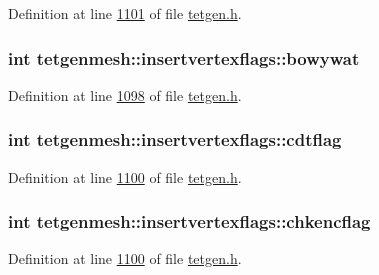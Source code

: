Definition at line \hyperlink{tetgen_8h_source_l01101}{1101} of file \hyperlink{tetgen_8h_source}{tetgen.\+h}.

\subsubsection[{\texorpdfstring{bowywat}{bowywat}}]{\setlength{\rightskip}{0pt plus 5cm}int tetgenmesh\+::insertvertexflags\+::bowywat}\hypertarget{classtetgenmesh_1_1insertvertexflags_a9b0fa5e802abd84a76e7e24c2dd448ac}{}\label{classtetgenmesh_1_1insertvertexflags_a9b0fa5e802abd84a76e7e24c2dd448ac}


Definition at line \hyperlink{tetgen_8h_source_l01098}{1098} of file \hyperlink{tetgen_8h_source}{tetgen.\+h}.

\subsubsection[{\texorpdfstring{cdtflag}{cdtflag}}]{\setlength{\rightskip}{0pt plus 5cm}int tetgenmesh\+::insertvertexflags\+::cdtflag}\hypertarget{classtetgenmesh_1_1insertvertexflags_a165eefd6dd465126f294084ef86a7a99}{}\label{classtetgenmesh_1_1insertvertexflags_a165eefd6dd465126f294084ef86a7a99}


Definition at line \hyperlink{tetgen_8h_source_l01100}{1100} of file \hyperlink{tetgen_8h_source}{tetgen.\+h}.

\subsubsection[{\texorpdfstring{chkencflag}{chkencflag}}]{\setlength{\rightskip}{0pt plus 5cm}int tetgenmesh\+::insertvertexflags\+::chkencflag}\hypertarget{classtetgenmesh_1_1insertvertexflags_a5751fba3e53f3be9d826f9fc96b180a4}{}\label{classtetgenmesh_1_1insertvertexflags_a5751fba3e53f3be9d826f9fc96b180a4}


Definition at line \hyperlink{tetgen_8h_source_l01100}{1100} of file \hyperlink{tetgen_8h_source}{tetgen.\+h}.

